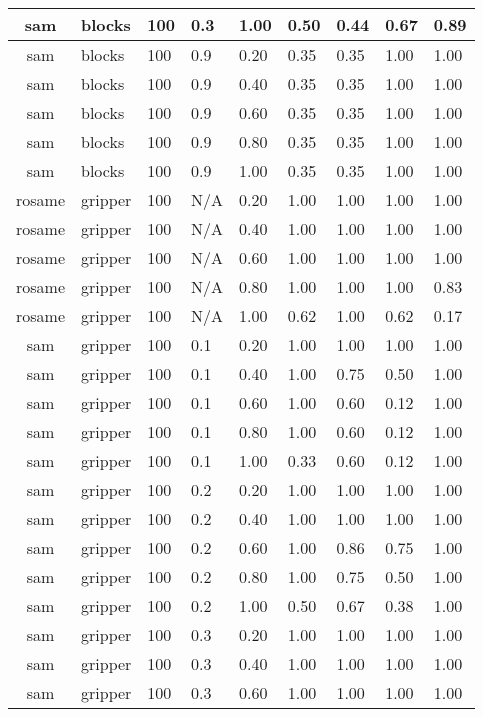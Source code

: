 \begin{table}[ht]
\begin{tabular}{c}
sam & blocks & 100 & 0.3 & 1.00 & 0.50 & 0.44 & 0.67 & 0.89 \\ \hline
sam & blocks & 100 & 0.9 & 0.20 & 0.35 & 0.35 & 1.00 & 1.00 \\ \hline
sam & blocks & 100 & 0.9 & 0.40 & 0.35 & 0.35 & 1.00 & 1.00 \\ \hline
sam & blocks & 100 & 0.9 & 0.60 & 0.35 & 0.35 & 1.00 & 1.00 \\ \hline
sam & blocks & 100 & 0.9 & 0.80 & 0.35 & 0.35 & 1.00 & 1.00 \\ \hline
sam & blocks & 100 & 0.9 & 1.00 & 0.35 & 0.35 & 1.00 & 1.00 \\ \hline
rosame & gripper & 100 & N/A & 0.20 & 1.00 & 1.00 & 1.00 & 1.00 \\ \hline
rosame & gripper & 100 & N/A & 0.40 & 1.00 & 1.00 & 1.00 & 1.00 \\ \hline
rosame & gripper & 100 & N/A & 0.60 & 1.00 & 1.00 & 1.00 & 1.00 \\ \hline
rosame & gripper & 100 & N/A & 0.80 & 1.00 & 1.00 & 1.00 & 0.83 \\ \hline
rosame & gripper & 100 & N/A & 1.00 & 0.62 & 1.00 & 0.62 & 0.17 \\ \hline
sam & gripper & 100 & 0.1 & 0.20 & 1.00 & 1.00 & 1.00 & 1.00 \\ \hline
sam & gripper & 100 & 0.1 & 0.40 & 1.00 & 0.75 & 0.50 & 1.00 \\ \hline
sam & gripper & 100 & 0.1 & 0.60 & 1.00 & 0.60 & 0.12 & 1.00 \\ \hline
sam & gripper & 100 & 0.1 & 0.80 & 1.00 & 0.60 & 0.12 & 1.00 \\ \hline
sam & gripper & 100 & 0.1 & 1.00 & 0.33 & 0.60 & 0.12 & 1.00 \\ \hline
sam & gripper & 100 & 0.2 & 0.20 & 1.00 & 1.00 & 1.00 & 1.00 \\ \hline
sam & gripper & 100 & 0.2 & 0.40 & 1.00 & 1.00 & 1.00 & 1.00 \\ \hline
sam & gripper & 100 & 0.2 & 0.60 & 1.00 & 0.86 & 0.75 & 1.00 \\ \hline
sam & gripper & 100 & 0.2 & 0.80 & 1.00 & 0.75 & 0.50 & 1.00 \\ \hline
sam & gripper & 100 & 0.2 & 1.00 & 0.50 & 0.67 & 0.38 & 1.00 \\ \hline
sam & gripper & 100 & 0.3 & 0.20 & 1.00 & 1.00 & 1.00 & 1.00 \\ \hline
sam & gripper & 100 & 0.3 & 0.40 & 1.00 & 1.00 & 1.00 & 1.00 \\ \hline
sam & gripper & 100 & 0.3 & 0.60 & 1.00 & 1.00 & 1.00 & 1.00 \\ \hline

\end{tabular}
\end{table}
